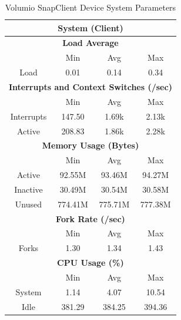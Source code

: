 \documentclass[11pt,a4paper,headinclude=false,footinclude=false]{scrreprt}
\begin{document}
\begin{table}[H]
\centering
    \begin{tabular}{||c|c|c|c|c|c|c||}
    \hline
    \multicolumn{7}{|c|}{\textbf{System (Client)}} \\
    \hline
    \multicolumn{7}{|c|}{\textbf{Load Average}} \\
    \hline\hline
      & \multicolumn{2}{|c|}{Min} & \multicolumn{2}{|c|}{Avg} & \multicolumn{2}{|c|}{Max} \\
    \hline
    Load & \multicolumn{2}{|c|}{0.01} & \multicolumn{2}{|c|}{0.14} & \multicolumn{2}{|c|}{0.34} \\
    \hline\hline
    \multicolumn{7}{|c|}{\textbf{Interrupts and Context Switches (/sec)}} \\
    \hline
      & \multicolumn{2}{|c|}{Min} & \multicolumn{2}{|c|}{Avg} & \multicolumn{2}{|c|}{Max} \\
    \hline
    Interrupts & \multicolumn{2}{|c|}{147.50} & \multicolumn{2}{|c|}{1.69k} & \multicolumn{2}{|c|}{2.13k} \\
    \hline
    Active & \multicolumn{2}{|c|}{208.83} & \multicolumn{2}{|c|}{1.86k} & \multicolumn{2}{|c|}{2.28k} \\
    \hline\hline
    \multicolumn{7}{|c|}{\textbf{Memory Usage (Bytes)}} \\
    \hline\hline
      & \multicolumn{2}{|c|}{Min} & \multicolumn{2}{|c|}{Avg} & \multicolumn{2}{|c|}{Max} \\
    \hline
    Active & \multicolumn{2}{|c|}{92.55M} & \multicolumn{2}{|c|}{93.46M} & \multicolumn{2}{|c|}{94.27M} \\
    \hline
    Inactive & \multicolumn{2}{|c|}{30.49M} & \multicolumn{2}{|c|}{30.54M} & \multicolumn{2}{|c|}{30.58M} \\
    \hline
    Unused & \multicolumn{2}{|c|}{774.41M} & \multicolumn{2}{|c|}{775.71M} & \multicolumn{2}{|c|}{777.38M} \\
    \hline\hline
    \multicolumn{7}{|c|}{\textbf{Fork Rate (/sec)}} \\
    \hline\hline
      & \multicolumn{2}{|c|}{Min} & \multicolumn{2}{|c|}{Avg} & \multicolumn{2}{|c|}{Max} \\
    \hline
    Forks & \multicolumn{2}{|c|}{1.30} & \multicolumn{2}{|c|}{1.34} & \multicolumn{2}{|c|}{1.43} \\
    \hline\hline
    \multicolumn{7}{|c|}{\textbf{CPU Usage (\%)}} \\
    \hline\hline
      & \multicolumn{2}{|c|}{Min} & \multicolumn{2}{|c|}{Avg} & \multicolumn{2}{|c|}{Max} \\
    \hline
    System & \multicolumn{2}{|c|}{1.14} & \multicolumn{2}{|c|}{4.07} & \multicolumn{2}{|c|}{10.54} \\
    \hline
    Idle & \multicolumn{2}{|c|}{381.29} & \multicolumn{2}{|c|}{384.25} & \multicolumn{2}{|c|}{394.36} \\
    \hline\hline
    \end{tabular}
    \caption{Volumio SnapClient Device System Parameters}
    \label{VolumioclientSysTab}
\end{table}
\end{document}
